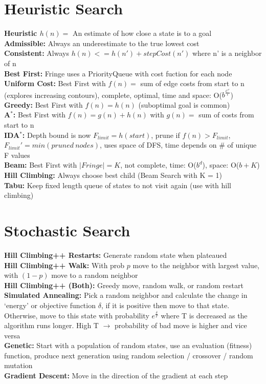 \documentclass[11pt, a4paper]{article}
\begin{document}
\begin{multicols*}{1}
        \section*{Heuristic Search}
            \textbf{Heuristic $h(n)=$} An estimate of how close a state is to a goal\\
            \textbf{Admissible:} Always an underestimate to the true lowest cost\\
            \textbf{Consistent:} Always $h(n) <= h(n') + stepCost(n')$ where n' is a neighbor of n\\
            \textbf{Best First:} Fringe uses a PriorityQueue with cost fuction for each node\\
            \textbf{Uniform Cost:} Best First with $f(n)=$ sum of edge costs from  start to n (explores increasing contours), complete, optimal, time and space: O($b^{\frac{C^*}{\epsilon}}$)\\
            \textbf{Greedy:} Best First with $f(n)= h(n)$ (suboptimal goal is common)\\
            \textbf{A$^*$:} Best First with $f(n)= g(n) + h(n)$ with $g(n)=$ sum of costs from start to n\\
            \textbf{IDA$^*$:} Depth bound is now $F_{limit} = h(start)$, prune if $f(n) > F_{limit}$,\\ $F_{limit}' = min(pruned\ nodes)$, uses space of DFS, time depends on \# of unique F values\\
            \textbf{Beam:} Best First with $|Fringe| = K$, not complete, time: O($b^d$), space: O($b + K$)\\
            \textbf{Hill Climbing:} Always choose best child (Beam Search with K = 1)\\
            \textbf{Tabu:} Keep fixed length queue of states to not visit again (use with hill climbing)\\
        \section*{Stochastic Search}
            \textbf{Hill Climbing++ Restarts:} Generate random state when plateaued\\
            \textbf{Hill Climbing++ Walk:} With prob $p$ move to the neighbor with largest value, with $(1 - p)$ move to a random neighbor\\
            \textbf{Hill Climbing++ (Both):} Greedy move, random walk, or random restart\\
            \textbf{Simulated Annealing:} Pick a random neighbor and calculate the change in `energy' or objective function $\delta$, if it is positive then move to that state. Otherwise, move to this state with probability $e^\frac{\delta}{T}$ where T is decreased as the algorithm runs longer. High T $\to$ probability of bad move is higher and vice versa\\
            \textbf{Genetic:} Start with a population of random states, use an evaluation (fitness) function, produce next generation using random selection / crossover / random mutation\\
            \textbf{Gradient Descent:} Move in the direction of the gradient at each step

\end{multicols*}
\end{document}
